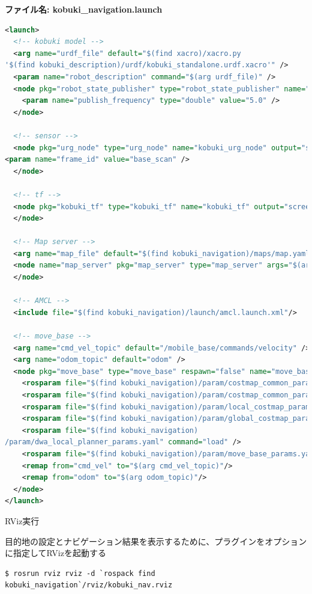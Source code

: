 \textbf{ファイル名: kobuki\_navigation.launch}
\begin{lstlisting}[language=XML]
<launch>
  <!-- kobuki model -->
  <arg name="urdf_file" default="$(find xacro)/xacro.py
'$(find kobuki_description)/urdf/kobuki_standalone.urdf.xacro'" />
  <param name="robot_description" command="$(arg urdf_file)" />
  <node pkg="robot_state_publisher" type="robot_state_publisher" name="robot_state_publisher" output=" screen">
    <param name="publish_frequency" type="double" value="5.0" />
  </node>

  <!-- sensor -->
  <node pkg="urg_node" type="urg_node" name="kobuki_urg_node" output="screen">
<param name="frame_id" value="base_scan" />
  </node>

  <!-- tf -->
  <node pkg="kobuki_tf" type="kobuki_tf" name="kobuki_tf" output="screen">
  </node>

  <!-- Map server -->
  <arg name="map_file" default="$(find kobuki_navigation)/maps/map.yaml"/>
  <node name="map_server" pkg="map_server" type="map_server" args="$(arg map_file)">
  </node>

  <!-- AMCL -->
  <include file="$(find kobuki_navigation)/launch/amcl.launch.xml"/>

  <!-- move_base -->
  <arg name="cmd_vel_topic" default="/mobile_base/commands/velocity" />
  <arg name="odom_topic" default="odom" />
  <node pkg="move_base" type="move_base" respawn="false" name="move_base" output="screen">
    <rosparam file="$(find kobuki_navigation)/param/costmap_common_params.yaml" command="load" ns=" global_costmap" />
    <rosparam file="$(find kobuki_navigation)/param/costmap_common_params.yaml" command="load" ns=" local_costmap" />
    <rosparam file="$(find kobuki_navigation)/param/local_costmap_params.yaml" command="load" />
    <rosparam file="$(find kobuki_navigation)/param/global_costmap_params.yaml" command="load" />
    <rosparam file="$(find kobuki_navigation)
/param/dwa_local_planner_params.yaml" command="load" />
    <rosparam file="$(find kobuki_navigation)/param/move_base_params.yaml" command="load" />
    <remap from="cmd_vel" to="$(arg cmd_vel_topic)"/>
    <remap from="odom" to="$(arg odom_topic)"/>
  </node>
</launch>
\end{lstlisting}

\circled{\thenum} RViz実行

目的地の設定とナビゲーション結果を表示するために、プラグインをオプションに指定してRVizを起動する

\begin{lstlisting}[language=ROS]
$ rosrun rviz rviz -d `rospack find kobuki_navigation`/rviz/kobuki_nav.rviz
\end{lstlisting}

